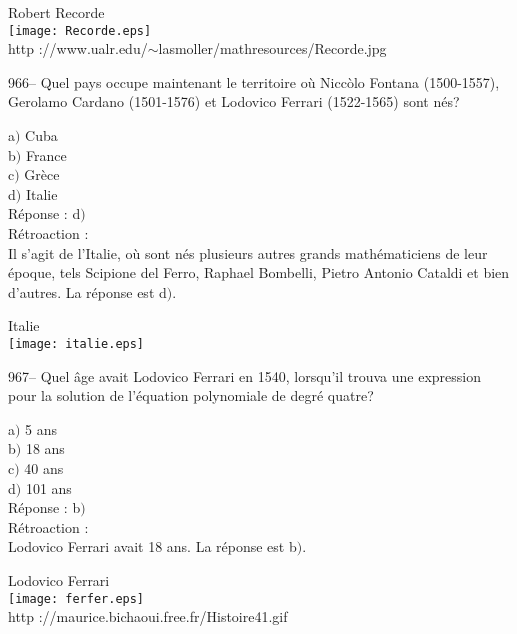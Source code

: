 ﻿\documentclass[letterpaper, 12pt]{article}
\begin{document}
        \begin{center}
        Robert Recorde\\
    \texttt{[image: Recorde.eps]}\\
        {\footnotesize http
://www.ualr.edu/$\sim$lasmoller/mathresources/Recorde.jpg}
    \end{center}

966-- Quel pays occupe maintenant le territoire o\`u Nicc\`olo
Fontana (1500-1557), Gerolamo Cardano (1501-1576) et Lodovico
Ferrari (1522-1565) sont n\'es?

a$)$ Cuba \\
b$)$ France  \\
c$)$ Gr\`ece \\
d$)$ Italie \\

R\'eponse : d$)$\\

R\'etroaction : \\
Il s'agit de l'Italie, o\`u sont n\'es plusieurs autres grands
math\'ematiciens de leur \'epoque, tels Scipione del Ferro, Raphael
Bombelli, Pietro Antonio Cataldi et bien d'autres. La r\'eponse est
d$)$.

        \begin{center}
        Italie\\
    \texttt{[image: italie.eps]}\\
    \end{center}

967-- Quel \^age avait Lodovico Ferrari en 1540, lorsqu'il trouva
une expression pour la solution de l'\'equation polynomiale de
degr\'e quatre?

a$)$ 5 ans \\
b$)$ 18 ans  \\
c$)$ 40 ans \\
d$)$ 101 ans \\

R\'eponse : b$)$\\

R\'etroaction : \\
Lodovico Ferrari avait 18 ans. La r\'eponse est b$)$.\\

        \begin{center}
        Lodovico Ferrari\\
    \texttt{[image: ferfer.eps]}\\
        {\footnotesize http ://maurice.bichaoui.free.fr/Histoire41.gif}
    \end{center}
\end{document}
